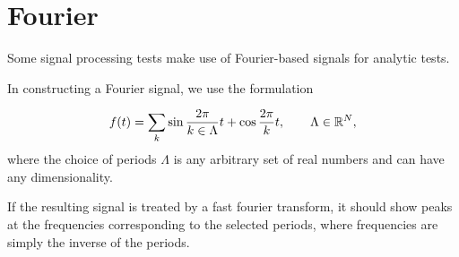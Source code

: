\section{Fourier}

Some signal processing tests make use of Fourier-based signals for analytic tests.

In constructing a Fourier signal, we use the formulation

\begin{equation}
  f(t) = \sum_{k} \sin\frac{2\pi}{k\in\Lambda}t + \cos\frac{2\pi}{k}t,\hspace{20pt}\Lambda\in\Bbb R^N,
\end{equation}
where the choice of periods $\Lambda$ is any arbitrary set of real numbers and can have any dimensionality.

If the resulting signal is treated by a fast fourier transform, it should show peaks at the frequencies
corresponding to the selected periods, where frequencies are simply the inverse of the periods.
